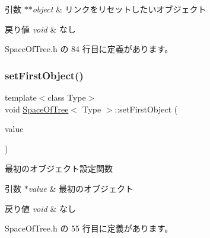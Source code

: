 \begin{DoxyParams}{引数}
{\em $\ast$$\ast$object} & リンクをリセットしたいオブジェクト \\
\hline
\end{DoxyParams}

\begin{DoxyRetVals}{戻り値}
{\em void} & なし \\
\hline
\end{DoxyRetVals}


 Space\+Of\+Tree.\+h の 84 行目に定義があります。

\mbox{\label{class_space_of_tree_a43844bf7bfbf0d021b9ae4708cb2e6f4}} 
\subsubsection{\texorpdfstring{set\+First\+Object()}{setFirstObject()}}
{\footnotesize\ttfamily template$<$class Type$>$ \\
void \mbox{\hyperlink{class_space_of_tree}{Space\+Of\+Tree}}$<$ Type $>$\+::set\+First\+Object (\begin{DoxyParamCaption}\item[{\mbox{\hyperlink{class_object_of_tree}{Object\+Of\+Tree}}$<$ Type $>$ $\ast$}]{value }\end{DoxyParamCaption})\hspace{0.3cm}{\ttfamily [inline]}}



最初のオブジェクト設定関数 


\begin{DoxyParams}{引数}
{\em $\ast$value} & 最初のオブジェクト \\
\hline
\end{DoxyParams}

\begin{DoxyRetVals}{戻り値}
{\em void} & なし \\
\hline
\end{DoxyRetVals}


 Space\+Of\+Tree.\+h の 55 行目に定義があります。

\mbox{\label{class_space_of_tree_a8f7238becd1df9192e5f5ddc442b7ee3}} 
